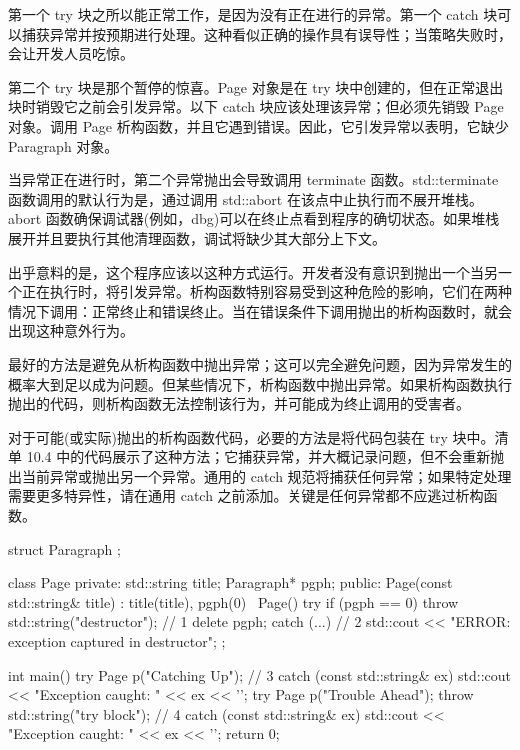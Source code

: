 第一个 try 块之所以能正常工作，是因为没有正在进行的异常。第一个 catch 块可以捕获异常并按预期进行处理。这种看似正确的操作具有误导性；当策略失败时，会让开发人员吃惊。

第二个 try 块是那个暂停的惊喜。Page 对象是在 try 块中创建的，但在正常退出块时销毁它之前会引发异常。以下 catch 块应该处理该异常；但必须先销毁 Page 对象。调用 Page 析构函数，并且它遇到错误。因此，它引发异常以表明，它缺少 Paragraph 对象。

当异常正在进行时，第二个异常抛出会导致调用 terminate 函数。std::terminate 函数调用的默认行为是，通过调用 std::abort 在该点中止执行而不展开堆栈。abort 函数确保调试器(例如，dbg)可以在终止点看到程序的确切状态。如果堆栈展开并且要执行其他清理函数，调试将缺少其大部分上下文。

出乎意料的是，这个程序应该以这种方式运行。开发者没有意识到抛出一个当另一个正在执行时，将引发异常。析构函数特别容易受到这种危险的影响，它们在两种情况下调用：正常终止和错误终止。当在错误条件下调用抛出的析构函数时，就会出现这种意外行为。


最好的方法是避免从析构函数中抛出异常；这可以完全避免问题，因为异常发生的概率大到足以成为问题。但某些情况下，析构函数中抛出异常。如果析构函数执行抛出的代码，则析构函数无法控制该行为，并可能成为终止调用的受害者。

对于可能(或实际)抛出的析构函数代码，必要的方法是将代码包装在 try 块中。清单 10.4 中的代码展示了这种方法；它捕获异常，并大概记录问题，但不会重新抛出当前异常或抛出另一个异常。通用的 catch 规范将捕获任何异常；如果特定处理需要更多特异性，请在通用 catch 之前添加。关键是任何异常都不应逃过析构函数。


\begin{cpp}
struct Paragraph {};

class Page {
private:
  std::string title;
  Paragraph* pgph;
public:
  Page(const std::string& title) : title(title), pgph(0) {}
  ~Page() {
    try {
      if (pgph == 0)
      throw std::string("destructor"); // 1
    delete pgph;
    } catch (...) { // 2
      std::cout << "ERROR: exception captured in destructor\n";
    }
  }
};

int main() {
  try {
    Page p("Catching Up"); // 3
  } catch (const std::string& ex) {
    std::cout << "Exception caught: " << ex << '\n';
  }
  try {
    Page p("Trouble Ahead");
    throw std::string("try block"); // 4
  } catch (const std::string& ex) {
    std::cout << "Exception caught: " << ex << '\n';
  }
  return 0;
}
\end{cpp}

